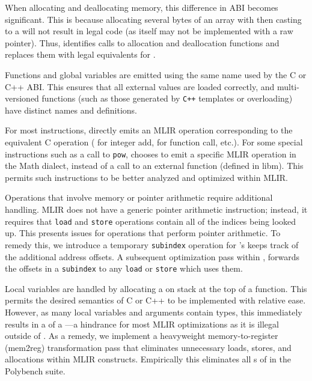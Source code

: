
When allocating and deallocating memory, this difference in ABI becomes significant. This is because allocating several bytes of an array with  then casting to a \memref will not result in legal code (as \memref itself may not be implemented with a raw pointer). Thus, \tool identifies calls to allocation and deallocation functions and replaces them with legal equivalents for \memref. 

Functions and global variables are emitted using the same name used by the C or C++ ABI. This ensures that all external values are loaded correctly, and multi-versioned functions (such as those generated by \texttt{C++} templates or overloading) have distinct names and definitions.

For most instructions, \tool directly emits an MLIR operation corresponding to the equivalent C operation ( for integer add,  for function call, etc.).  For some special instructions such as a call to \texttt{pow}, \tool chooses to emit a specific MLIR operation in the Math dialect, instead of a call to an external function (defined in libm). This permits such instructions to be better analyzed and optimized within MLIR.

Operations that involve memory or pointer arithmetic require additional handling. MLIR does not have a generic pointer arithmetic instruction; instead, it requires that \texttt{load} and \texttt{store} operations contain all of the indices being looked up. This presents issues for operations that perform pointer arithmetic. To remedy this, we introduce a temporary \texttt{subindex} operation for \memref's keeps track of the additional address offsets. A subsequent optimization pass within \tool, forwards the offsets in a \texttt{subindex} to any \texttt{load} or \texttt{store} which uses them.

Local variables are handled by allocating a \memref on stack at the top of a function. This permits the desired semantics of C or C++ to be implemented with relative ease. However, as many local variables and arguments contain \memref types, this immediately results in a \memref of a \memref---a hindrance for most MLIR optimizations as it is illegal outside of \tool. As a remedy, we implement a heavyweight memory-to-register (mem2reg) transformation pass that eliminates unnecessary loads, stores, and allocations within MLIR constructs. Empirically this eliminates all {\memref}s of \memref in the Polybench suite.


